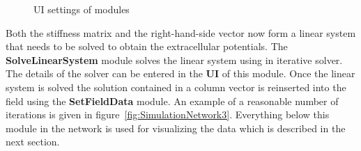 \documentclass[fleqn,11pt,openany]{book}
\begin{document}
\begin{figure}
\caption{UI settings of modules}\label{fig:SimulationNetwork2}
\end{figure}

Both the stiffness matrix and the right-hand-side vector now form a linear system that needs to be solved to obtain the extracellular potentials. The {\bf SolveLinearSystem} module solves the linear system using in iterative solver. The details of the solver can be entered in the {\bf UI} of this module. Once the linear system is solved the solution contained in a column vector is reinserted into the field using the {\bf SetFieldData} module. An example of a reasonable number of iterations is given in figure~\ref{fig:SimulationNetwork3}.
Everything below this module in the network is used for visualizing the data which is described in the next section.
\end{document}
